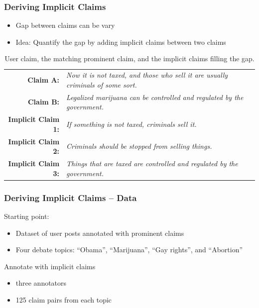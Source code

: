 \documentclass{beamer}
\begin{document}
\begin{frame}
	\frametitle{Deriving Implicit Claims}

	\begin{itemize}
		\item Gap between claims can be vary
		\item Idea: Quantify the gap by adding implicit claims between two claims
	\end{itemize}

\begin{table}
{\scriptsize
\begin{tabular}{|@{\ }r@{\ \  }p{}|}
\hline
\textbf{Claim A:} & \emph{Now it is not taxed, and those who sell it are
	usually criminals of some sort.}\\
\textbf{Claim B:} & \emph{Legalized marijuana can be controlled and
	regulated by the government.}\\
\textbf{Implicit Claim 1:} & \emph{If something is not taxed, criminals sell
	it.}\\
\textbf{Implicit Claim 2:} & \emph{Criminals should be stopped from selling
	things.}\\
\textbf{Implicit Claim 3:} & \emph{Things that are taxed are controlled and
	regulated by the government.}\\
\hline
\end{tabular}}
\caption{User claim, the matching prominent claim, and the implicit claims filling the gap.}
\label{tab:premise_example}
\end{table}
\end{frame}

\begin{frame}
	\frametitle{Deriving Implicit Claims -- Data}
	Starting point:
	\begin{itemize}
		\item  Dataset of user posts annotated with prominent claims \cite{hasan2014you}
		\item Four debate topics:  ``Obama'', ``Marijuana'', ``Gay rights'', and ``Abortion'' 
	\end{itemize}
	Annotate with implicit claims
	\begin{itemize}
		\item three annotators
		\item 125 claim pairs from each topic
	\end{itemize}

\end{frame}
\end{document}
